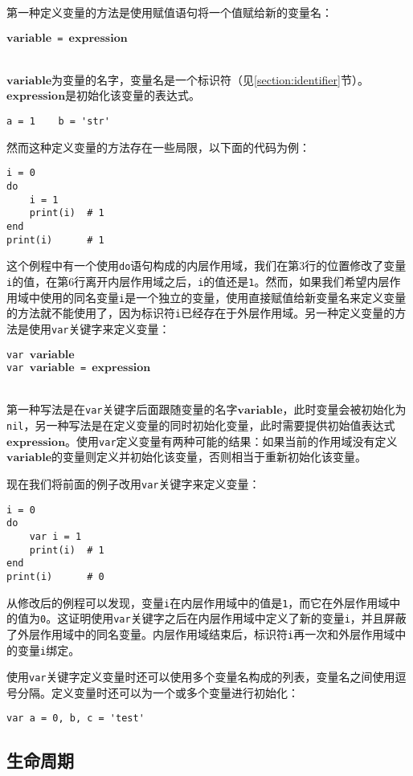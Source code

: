 第一种定义变量的方法是使用赋值语句将一个值赋给新的变量名：
\begin{algorithm}
$\bm{variable}$\texttt{ = }$\bm{expression}$
\end{algorithm}\vspace{-0.6em}\\
$\bm{variable}$为变量的名字，变量名是一个标识符（见\ref{section:identifier}节）。$\bm{expression}$是初始化该变量的表达式。
\begin{lstlisting}[language=berry, numbers=none]
a = 1    b = 'str'
\end{lstlisting}
然而这种定义变量的方法存在一些局限，以下面的代码为例：
\begin{lstlisting}[language=berry]
i = 0
do
    i = 1
    print(i)  # 1
end
print(i)      # 1
\end{lstlisting}
这个例程中有一个使用\texttt{do}语句构成的内层作用域，我们在第3行的位置修改了变量\texttt{i}的值，在第6行离开内层作用域之后，\texttt{i}的值还是\texttt{1}。然而，如果我们希望内层作用域中使用的同名变量\texttt{i}是一个独立的变量，使用直接赋值给新变量名来定义变量的方法就不能使用了，因为标识符\texttt{i}已经存在于外层作用域。另一种定义变量的方法是使用\texttt{var}关键字来定义变量：
\begin{algorithm}
\texttt{var }$\bm{variable}$ \\
\texttt{var }$\bm{variable}$\texttt{ = }$\bm{expression}$
\end{algorithm}\vspace{-0.6em}\\
第一种写法是在\texttt{var}关键字后面跟随变量的名字$\bm{variable}$，此时变量会被初始化为\texttt{nil}，另一种写法是在定义变量的同时初始化变量，此时需要提供初始值表达式$\bm{expression}$。使用\texttt{var}定义变量有两种可能的结果：如果当前的作用域没有定义$\bm{variable}$的变量则定义并初始化该变量，否则相当于重新初始化该变量。

现在我们将前面的例子改用\texttt{var}关键字来定义变量：
\begin{lstlisting}[language=berry]
i = 0
do
    var i = 1
    print(i)  # 1
end
print(i)      # 0
\end{lstlisting}
从修改后的例程可以发现，变量\texttt{i}在内层作用域中的值是\texttt{1}，而它在外层作用域中的值为\texttt{0}。这证明使用\texttt{var}关键字之后在内层作用域中定义了新的变量\texttt{i}，并且屏蔽了外层作用域中的同名变量。内层作用域结束后，标识符\texttt{i}再一次和外层作用域中的变量\texttt{i}绑定。

使用\texttt{var}关键字定义变量时还可以使用多个变量名构成的列表，变量名之间使用逗号分隔。定义变量时还可以为一个或多个变量进行初始化：
\begin{lstlisting}[language=berry, numbers=none]
var a = 0, b, c = 'test'
\end{lstlisting}

\subsection{生命周期}
